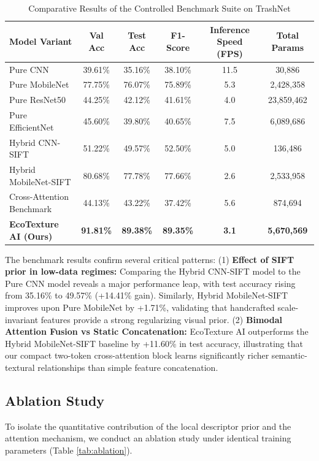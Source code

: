 \documentclass[12pt, a4paper]{article}
\begin{document}
\begin{table}[H]
\centering
\caption{Comparative Results of the Controlled Benchmark Suite on TrashNet}
\label{tab:benchmark}
\begin{tabular}{lccccc}
\toprule
\textbf{Model Variant} & \textbf{Val Acc} & \textbf{Test Acc} & \textbf{F1-Score} & \textbf{Inference Speed (FPS)} & \textbf{Total Params} \\
\midrule
Pure CNN & 39.61\% & 35.16\% & 38.10\% & 11.5 & 30,886 \\
Pure MobileNet & 77.75\% & 76.07\% & 75.89\% & 5.3 & 2,428,358 \\
Pure ResNet50 & 44.25\% & 42.12\% & 41.61\% & 4.0 & 23,859,462 \\
Pure EfficientNet & 45.60\% & 39.80\% & 40.65\% & 7.5 & 6,089,686 \\
Hybrid CNN-SIFT & 51.22\% & 49.57\% & 52.50\% & 5.0 & 136,486 \\
Hybrid MobileNet-SIFT & 80.68\% & 77.78\% & 77.66\% & 2.6 & 2,533,958 \\
Cross-Attention Benchmark & 44.13\% & 43.22\% & 37.42\% & 5.6 & 874,694 \\
\textbf{EcoTexture AI (Ours)} & \textbf{91.81\%} & \textbf{89.38\%} & \textbf{89.35\%} & \textbf{3.1} & \textbf{5,670,569} \\
\bottomrule
\end{tabular}
\end{table}

The benchmark results confirm several critical patterns:
(1) \textbf{Effect of SIFT prior in low-data regimes:} Comparing the Hybrid CNN-SIFT model to the Pure CNN model reveals a major performance leap, with test accuracy rising from 35.16\% to 49.57\% (+14.41\% gain). Similarly, Hybrid MobileNet-SIFT improves upon Pure MobileNet by +1.71\%, validating that handcrafted scale-invariant features provide a strong regularizing visual prior.
(2) \textbf{Bimodal Attention Fusion vs Static Concatenation:} EcoTexture AI outperforms the Hybrid MobileNet-SIFT baseline by +11.60\% in test accuracy, illustrating that our compact two-token cross-attention block learns significantly richer semantic-textural relationships than simple feature concatenation.

\subsection{Ablation Study}
To isolate the quantitative contribution of the local descriptor prior and the attention mechanism, we conduct an ablation study under identical training parameters (Table \ref{tab:ablation}).
\end{document}

